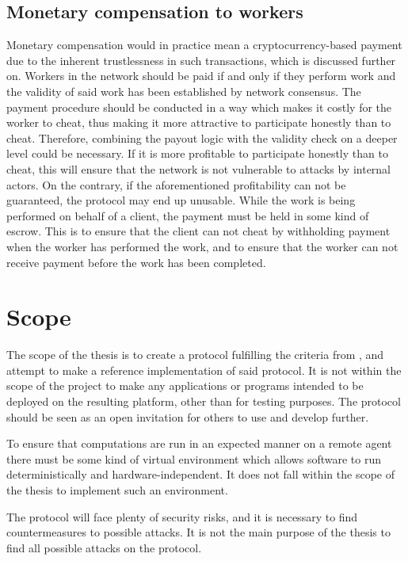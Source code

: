 \subsection{Monetary compensation to workers}
\label{sec:prob:compensation}
Monetary compensation would in practice mean a cryptocurrency-based payment due to the inherent trustlessness in such transactions, which is discussed further on. Workers in the network should be paid if and only if they perform work and the validity of said work has been established by network consensus. The payment procedure should be conducted in a way which makes it costly for the worker to cheat, thus making it more attractive to participate honestly than to cheat. Therefore, combining the payout logic with the validity check on a deeper level could be necessary. If it is more profitable to participate honestly than to cheat, this will ensure that the network is not vulnerable to attacks by internal actors. On the contrary, if the aforementioned profitability can not be guaranteed, the protocol may end up unusable. While the work is being performed on behalf of a client, the payment must be held in some kind of escrow. This is to ensure that the client can not cheat by withholding payment when the worker has performed the work, and to ensure that the worker can not receive payment before the work has been completed.

\section{Scope}
The scope of the thesis is to create a protocol fulfilling the criteria from , and attempt to make a reference implementation of said protocol. It is not within the scope of the project to make any applications or programs intended to be deployed on the resulting platform, other than for testing purposes. The protocol should be seen as an open invitation for others to use and develop further.

To ensure that computations are run in an expected manner on a remote agent there must be some kind of virtual environment which allows software to run deterministically and hardware-independent. It does not fall within the scope of the thesis to implement such an environment.

The protocol will face plenty of security risks, and it is necessary to find countermeasures to possible attacks. It is not the main purpose of the thesis to find all possible attacks on the protocol.